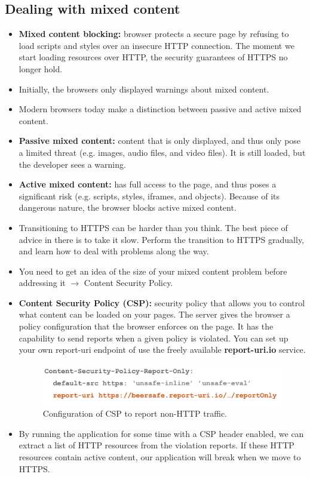 \documentclass[../main.tex]{subfiles}
\begin{document}
\subsection{Dealing with mixed content}
\begin{itemize}
\item \textbf{Mixed content blocking:} browser protects a secure page by refusing to load scripts and styles over an insecure HTTP connection. The moment we start loading resources over HTTP, the security guarantees of HTTPS no longer hold.
\item Initially, the browsers only displayed warnings about mixed content.
\item Modern browsers today make a distinction between passive and active mixed content.
\item \textbf{Passive mixed content:}  content that is only displayed, and thus only pose a limited threat (e.g. images, audio files, and video files). It is still loaded, but the developer sees a warning.
\item \textbf{Active mixed content:} has full access to the page, and thus poses a significant risk (e.g. scripts, styles, iframes, and objects). Because of its dangerous nature, the browser blocks active mixed content.
\item Transitioning to HTTPS can be harder than you think. The best piece of advice in there is to take it slow. Perform the transition to HTTPS gradually, and learn how to deal with problems along the way.
\item You need to get an idea of the size of your mixed content problem before addressing it $\rightarrow$ Content Security Policy.
\item \textbf{Content Security Policy (CSP):} security policy that allows you to control what content can be loaded on your pages. The server gives the browser a policy configuration that the browser enforces on the page. It has the capability to send reports when a given policy is violated. You can set up your own report-uri endpoint of use the freely available \textbf{report-uri.io} service.
\begin{figure}[h!]
\includegraphics[width=\textwidth]{../images/csp}
\caption{Configuration of CSP to report non-HTTP traffic.}
\end{figure}
\item By running the application for some time with a CSP header enabled, we can extract a list of HTTP resources from the violation reports. If these HTTP resources contain active content, our application will break when we move to HTTPS.
\end{itemize}
\end{document}
